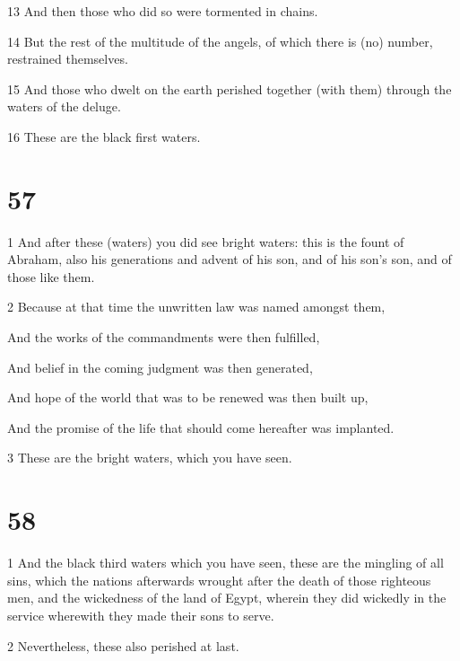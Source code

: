 \par 13 And then those who did so were tormented in chains. 

\par 14 But the rest of the multitude of the angels, of which there is (no) number, restrained themselves. 

\par 15 And those who dwelt on the earth perished together (with them) through the waters of the deluge. 

\par 16 These are the black first waters.

\chapter{57}

\par 1 And after these (waters) you did see bright waters: this is the fount of Abraham, also his generations and advent of his son, and of his son's son, and of those like them. 

\par 2 Because at that time the unwritten law was named amongst them,

\par And the works of the commandments were then fulfilled,

\par And belief in the coming judgment was then generated,

\par And hope of the world that was to be renewed was then built up,

\par And the promise of the life that should come hereafter was implanted.

\par 3 These are the bright waters, which you have seen.

\chapter{58}

\par 1 And the black third waters which you have seen, these are the mingling of all sins, which the nations afterwards wrought after the death of those righteous men, and the wickedness of the land of Egypt, wherein they did wickedly in the service wherewith they made their sons to serve. 

\par 2 Nevertheless, these also perished at last.

